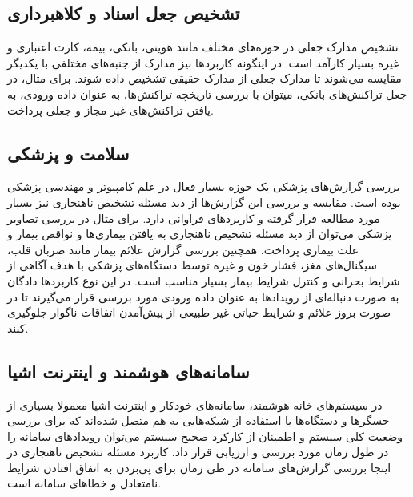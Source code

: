\documentclass[12pt,a4paper]{report}
\begin{document}
\subsection{تشخیص جعل اسناد و کلاهبرداری}
تشخیص مدارک جعلی در حوزه‌های مختلف مانند هویتی، بانکی، بیمه، کارت اعتباری و غیره بسیار کارآمد است. در اینگونه کاربردها نیز مدارک از جنبه‌های مختلفی با یکدیگر مقایسه می‌شوند تا مدارک جعلی از مدارک حقیقی تشخیص داده شوند. برای مثال، در جعل تراکنش‌های بانکی، میتوان با بررسی تاریخچه تراکنش‌ها، به عنوان داده ورودی، به یافتن تراکنش‌های غیر مجاز و جعلی پرداخت.

\subsection{سلامت و پزشکی}
بررسی گزارش‌های پزشکی یک حوزه بسیار فعال در علم کامپیوتر و مهندسی پزشکی بوده است. مقایسه و بررسی این گزارش‌ها از دید مسئله تشخیص ناهنجاری نیز بسیار مورد مطالعه قرار گرفته و کاربرد‌های فراوانی دارد. برای مثال در بررسی تصاویر پزشکی می‌توان از دید مسئله تشخیص ناهنجاری به یافتن بیماری‌ها و نواقص بیمار و علت بیماری پرداخت. همچنین بررسی گزارش علائم بیمار مانند ضربان قلب، سیگنال‌های مغز، فشار خون و غیره توسط دستگاه‌های پزشکی با هدف آگاهی از شرایط بحرانی و کنترل شرایط بیمار بسیار مناسب است. در این نوع کاربرد‌ها دادگان به صورت دنباله‌ای از رویداد‌ها به عنوان داده ورودی مورد بررسی قرار می‌گیرند تا در صورت بروز علائم و شرایط حیاتی غیر طبیعی از پیش‌آمدن اتفاقات ناگوار جلوگیری کنند.
\subsection{سامانه‌های هوشمند و اینترنت اشیا}
در سیستم‌های خانه هوشمند، سامانه‌های خودکار و اینترنت اشیا معمولا بسیاری از حسگر‌ها و دستگاه‌ها با استفاده از شبکه‌هایی به هم متصل شده‌اند که برای بررسی وضعیت کلی سیستم و اطمینان از کارکرد صحیح سیستم می‌توان رویداد‌های سامانه را در طول زمان مورد بررسی و ارزیابی قرار داد. کاربرد مسئله تشخیص ناهنجاری در اینجا بررسی گزارش‌های سامانه در طی زمان برای پی‌بردن به اتفاق افتادن شرایط نامتعادل و خطا‌های سامانه است.
\end{document}
